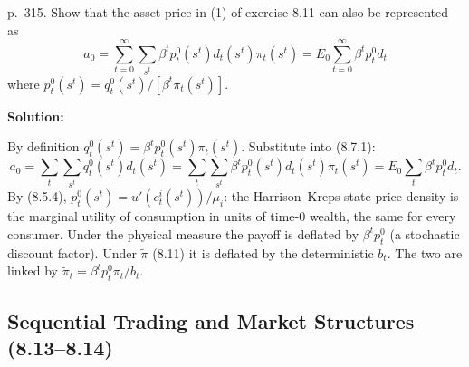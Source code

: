 \documentclass[12pt, letterpaper]{article}
\begin{document}
\begin{tcolorbox}[evenbox,title={Exercise 8.12 \quad Harrison--Kreps prices}]
\begin{tcolorbox}[questionbox]
p.~315. Show that the asset price in (1) of exercise 8.11 can also be represented as
\[
a_0=\sum_{t=0}^\infty\sum_{s^t}\beta^tp^0_t(s^t)d_t(s^t)\pi_t(s^t)=E_0\sum_{t=0}^\infty\beta^tp^0_td_t
\]
where $p^0_t(s^t)=q^0_t(s^t)/[\beta^t\pi_t(s^t)]$.
\end{tcolorbox}

\textbf{Solution:}

By definition $q^0_t(s^t)=\beta^tp^0_t(s^t)\pi_t(s^t)$. Substitute into (8.7.1):
\[
a_0=\sum_t\sum_{s^t}q^0_t(s^t)d_t(s^t)=\sum_t\sum_{s^t}\beta^tp^0_t(s^t)d_t(s^t)\pi_t(s^t)=E_0\sum_t\beta^tp^0_td_t .
\]
By (8.5.4), $p^0_t(s^t)=u'(c^i_t(s^t))/\mu_i$: the Harrison--Kreps state-price density is the marginal utility of
consumption in units of time-0 wealth, the same for every consumer. Under the physical measure the payoff is
deflated by $\beta^tp^0_t$ (a stochastic discount factor). Under $\tilde\pi$ (8.11) it is deflated by the
deterministic $b_t$. The two are linked by $\tilde\pi_t=\beta^tp^0_t\pi_t/b_t$.
\end{tcolorbox}

\subsection{Sequential Trading and Market Structures (8.13--8.14)}
\end{document}
